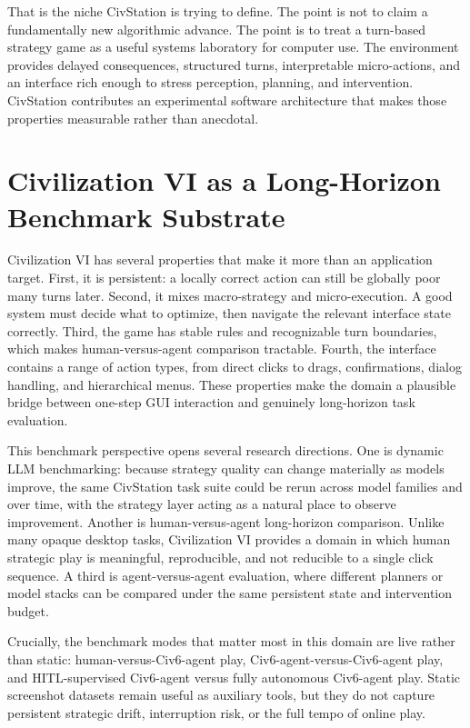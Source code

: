 That is the niche CivStation is trying to define. The point is not to claim a fundamentally new algorithmic advance. The point is to treat a turn-based strategy game as a useful systems laboratory for computer use. The environment provides delayed consequences, structured turns, interpretable micro-actions, and an interface rich enough to stress perception, planning, and intervention. CivStation contributes an experimental software architecture that makes those properties measurable rather than anecdotal.

\section{Civilization VI as a Long-Horizon Benchmark Substrate}

Civilization VI has several properties that make it more than an application target. First, it is persistent: a locally correct action can still be globally poor many turns later. Second, it mixes macro-strategy and micro-execution. A good system must decide what to optimize, then navigate the relevant interface state correctly. Third, the game has stable rules and recognizable turn boundaries, which makes human-versus-agent comparison tractable. Fourth, the interface contains a range of action types, from direct clicks to drags, confirmations, dialog handling, and hierarchical menus. These properties make the domain a plausible bridge between one-step GUI interaction and genuinely long-horizon task evaluation.

This benchmark perspective opens several research directions. One is dynamic LLM benchmarking: because strategy quality can change materially as models improve, the same CivStation task suite could be rerun across model families and over time, with the strategy layer acting as a natural place to observe improvement. Another is human-versus-agent long-horizon comparison. Unlike many opaque desktop tasks, Civilization VI provides a domain in which human strategic play is meaningful, reproducible, and not reducible to a single click sequence. A third is agent-versus-agent evaluation, where different planners or model stacks can be compared under the same persistent state and intervention budget.

Crucially, the benchmark modes that matter most in this domain are live rather than static: human-versus-Civ6-agent play, Civ6-agent-versus-Civ6-agent play, and HITL-supervised Civ6-agent versus fully autonomous Civ6-agent play. Static screenshot datasets remain useful as auxiliary tools, but they do not capture persistent strategic drift, interruption risk, or the full tempo of online play.

